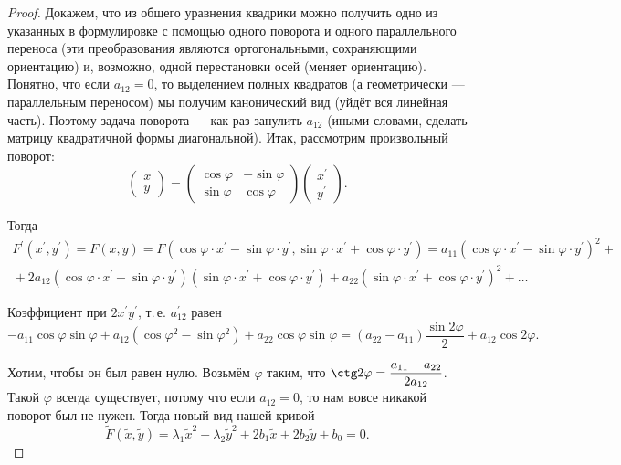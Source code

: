 \begin{proof}
    Докажем, что из общего уравнения квадрики можно получить одно из указанных в формулировке с помощью одного поворота и одного параллельного переноса (эти преобразования являются ортогональными, сохраняющими ориентацию) и, возможно, одной перестановки осей (меняет ориентацию). Понятно, что если $a_{12} = 0$, то выделением полных квадратов (а геометрически --- параллельным переносом) мы получим канонический вид (уйдёт вся линейная часть). Поэтому задача поворота --- как раз занулить $a_{12}$ (иными словами, сделать матрицу квадратичной формы диагональной). Итак, рассмотрим произвольный поворот:
    $$
    \begin{pmatrix}
        x\\y
    \end{pmatrix} = 
    \begin{pmatrix}
        \cos\varphi & -\sin\varphi\\
        \sin\varphi & \cos\varphi
    \end{pmatrix}
    \begin{pmatrix}
        x^\prime\\
        y^\prime
    \end{pmatrix}.
    $$

    Тогда
    $$
    \begin{array}{c}
        F^\prime(x^\prime, y^\prime) = F(x, y) = F(\cos\varphi\cdot x^\prime - \sin\varphi\cdot y^\prime, \sin\varphi\cdot x^\prime + \cos\varphi\cdot y^\prime) = a_{11}(\cos\varphi\cdot x^\prime - \sin\varphi\cdot y^\prime)^2 + {}\\{} + 2a_{12}(\cos\varphi\cdot x^\prime - \sin\varphi\cdot y^\prime)(\sin\varphi\cdot x^\prime + \cos\varphi\cdot y^\prime) + a_{22}(\sin\varphi\cdot x^\prime + \cos\varphi\cdot y^\prime)^2 + \ldots
    \end{array}
    $$

    Коэффициент при $2x^\prime y^\prime$, т.\,е. $a_{12}^\prime$ равен
    $$
    -a_{11}\cos\varphi\sin\varphi + a_{12}(\cos\varphi^2 - \sin\varphi^2) + a_{22}\cos\varphi\sin\varphi = (a_{22} - a_{11})\frac{\sin 2\varphi}{2} + a_{12}\cos 2\varphi.
    $$

    Хотим, чтобы он был равен нулю. Возьмём $\varphi$ таким, что $\displaystyle \ctg 2\varphi = \frac{a_{11} - a_{22}}{2a_{12}}$. Такой $\varphi$ всегда существует, потому что если $a_{12} = 0$, то нам вовсе никакой поворот был не нужен. Тогда новый вид нашей кривой
    $$
    \widetilde{F}(\widetilde{x}, \widetilde{y}) = \lambda_1 \widetilde{x}^2 + \lambda_2 \widetilde{y}^2 + 2b_1\widetilde{x} + 2b_2\widetilde{y} + b_0 = 0.
    $$


\end{proof}
